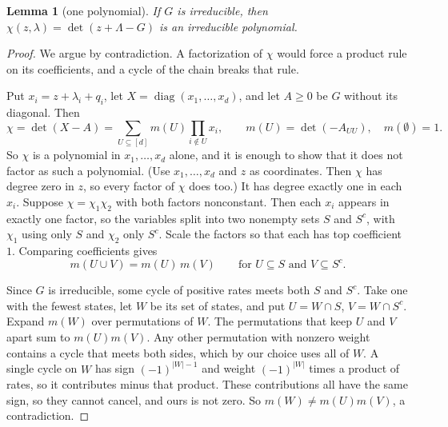 \documentclass[11pt]{article}
\newtheorem{lemma}[theorem]{Lemma}
\theoremstyle{definition}
\theoremstyle{remark}
\begin{document}
\begin{lemma}[one polynomial]\label{lem:irred}
If $G$ is irreducible, then $\chi(z,\lambda)=\det(z+\Lambda-G)$ is an irreducible
polynomial.
\end{lemma}
\begin{proof}
We argue by contradiction. A factorization of $\chi$ would force a product rule
on its coefficients, and a cycle of the chain breaks that rule.

Put $x_i=z+\lambda_i+q_i$, let $X=\operatorname{diag}(x_1,\ldots,x_d)$, and let
$A\ge0$ be $G$ without its diagonal. Then
\[
\chi=\det(X-A)=\sum_{U\subseteq[d]}m(U)\prod_{i\notin U}x_i,
\qquad m(U)=\det(-A_{UU}),\quad m(\emptyset)=1 .
\]
So $\chi$ is a polynomial in $x_1,\ldots,x_d$ alone, and it is enough to show
that it does not factor as such a polynomial. (Use $x_1,\ldots,x_d$ and $z$ as
coordinates. Then $\chi$ has degree zero in $z$, so every factor of $\chi$ does
too.) It has degree exactly one in
each $x_i$. Suppose $\chi=\chi_1\chi_2$ with both factors nonconstant. Then each
$x_i$ appears in exactly one factor, so the variables split into two nonempty
sets $S$ and $S^c$, with $\chi_1$ using only $S$ and $\chi_2$ only $S^c$. Scale
the factors so that each has top coefficient $1$. Comparing coefficients gives
\[
m(U\cup V)=m(U)\,m(V)\qquad\text{for }U\subseteq S\text{ and }V\subseteq S^c .
\]

Since $G$ is irreducible, some cycle of positive rates meets both $S$ and $S^c$.
Take one with the fewest states, let $W$ be its set of states, and put
$U=W\cap S$, $V=W\cap S^c$. Expand $m(W)$ over permutations of $W$. The
permutations that keep $U$ and $V$ apart sum to $m(U)m(V)$. Any other permutation
with nonzero weight contains a cycle that meets both sides, which by our choice
uses all of $W$. A single cycle on $W$ has sign $(-1)^{|W|-1}$ and weight
$(-1)^{|W|}$ times a product of rates, so it contributes minus that product.
These contributions all have the same sign, so they cannot cancel, and ours is
not zero. So $m(W)\ne m(U)m(V)$, a contradiction.
\end{proof}
\end{document}

